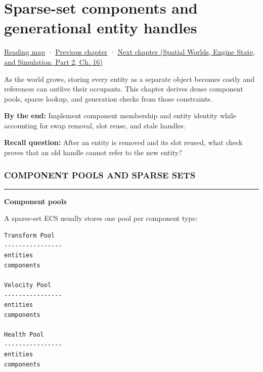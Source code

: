 \chapter{Sparse-set components and generational entity handles}\label{05-engine-i-ch015-sparse-set-components-and-generational-entity-handles}\hypertarget{05-engine-i-ch015}{}\label{stagechapter:05-engine-i-ch015}

\hypertarget{05-engine-i-ch015-sparse-set-components-and-generational-entity-handles}{}

\hyperref[volume-reading-map]{Reading map} · \hyperref[05-engine-i-ch014-application-clocks-and-stable-input-identity]{Previous chapter} · \href{../05-Spatial-Worlds-Engine-State-and-Simulation-P02/main.pdf\#05-engine-i-ch016-archetypes-chunks-relationships-and-transforms}{Next chapter (Spatial Worlds, Engine State, and Simulation, Part 2, Ch. 16)}

As the world grows, storing every entity as a separate object becomes costly and references can outlive their occupants. This chapter derives dense component pools, sparse lookup, and generation checks from those constraints.

\textbf{By the end:} Implement component membership and entity identity while accounting for swap removal, slot reuse, and stale handles.

\textbf{Recall question:} After an entity is removed and its slot reused, what check proves that an old handle cannot refer to the new entity?

\subsection{COMPONENT POOLS AND SPARSE SETS}\label{05-engine-i-ch015-component-pools-and-sparse-sets}

\hypertarget{05-engine-i-ch015-component-pools-and-sparse-sets}{}

\begin{center}\rule{0.5\linewidth}{0.5pt}\end{center}

\textbf{Component pools}

A sparse-set ECS usually stores one pool per component type:

\begin{verbatim}
Transform Pool
----------------
entities
components

Velocity Pool
----------------
entities
components

Health Pool
----------------
entities
components
\end{verbatim}

